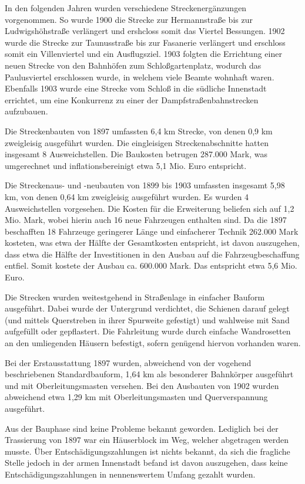 In den folgenden Jahren wurden verschiedene Streckenergänzungen vorgenommen. So
wurde 1900 die Strecke zur Hermannstraße bis zur Ludwigshöhstraße verlängert und
ershcloss somit das Viertel Bessungen. 1902 wurde die Strecke zur Taunusstraße
bis zur Fasanerie verlängert und erschloss somit ein Villenviertel und ein
Ausflugsziel. 1903 folgten die Errichtung einer neuen Strecke von den Bahnhöfen
zum Schloßgartenplatz, wodurch das Paulusviertel erschlossen wurde, in welchem
viele Beamte wohnhaft waren. Ebenfalls 1903 wurde eine Strecke vom Schloß in die
südliche Innenstadt errichtet, um eine Konkurrenz zu einer der
Dampfstraßenbahnstrecken aufzubauen.

Die Streckenbauten von 1897 umfassten 6,4 km Strecke, von denen 0,9 km
zweigleisig ausgeführt wurden. Die eingleisigen Streckenabschnitte hatten
insgesamt 8 Ausweichstellen.  Die Baukosten betrugen 287.000 Mark, was
umgerechnet und inflationsbereinigt etwa 5,1 Mio. Euro entspricht. \cite{UmrechnungGoldmark}

Die Streckenaus- und -neubauten von 1899 bis 1903 umfassten insgesamt 5,98 km,
von denen 0,64 km zweigleisig ausgeführt wurden. Es wurden 4 Ausweichstellen
vorgesehen. Die Kosten für die Erweiterung beliefen sich auf 1,2 Mio. Mark,
wobei hierin auch 16 neue Fahrzeugen enthalten sind. Da die 1897 beschafften 18
Fahrzeuge geringerer Länge und einfacherer Technik 262.000 Mark kosteten, was
etwa der Hälfte der Gesamtkosten entspricht, ist davon auszugehen, dass etwa die
Hälfte der Investitionen in den Ausbau auf die Fahrzeugbeschaffung
entfiel. Somit kostete der Ausbau ca. 600.000 Mark. Das entspricht etwa 5,6 Mio.
Euro.

Die Strecken wurden weitestgehend in Straßenlage in einfacher Bauform
ausgeführt. Dabei wurde der Untergrund verdichtet, die Schienen darauf gelegt
(und mittels Querstreben in ihrer Spurweite gefestigt) und wahlweise mit Sand
aufgefüllt oder gepflastert. Die Fahrleitung wurde durch einfache Wandrosetten
an den umliegenden Häusern befestigt, sofern genügend hiervon vorhanden waren.

Bei der Erstausstattung 1897 wurden, abweichend von der vogehend beschriebenen
Standardbauform, 1,64 km als besonderer Bahnkörper ausgeführt und mit
Oberleitungsmasten versehen.  Bei den Ausbauten von 1902 wurden abweichend etwa
1,29 km mit Oberleitungsmasten und Querverspannung ausgeführt.

Aus der Bauphase sind keine Probleme bekannt geworden. Lediglich bei der
Trassierung von 1897 war ein Häuserblock im Weg, welcher abgetragen werden
musste. Über Entschädigungszahlungen ist nichts bekannt, da sich die fragliche
Stelle jedoch in der armen Innenstadt befand ist davon auszugehen, dass keine
Entschädigungszahlungen in nennenswertem Umfang gezahlt wurden.

